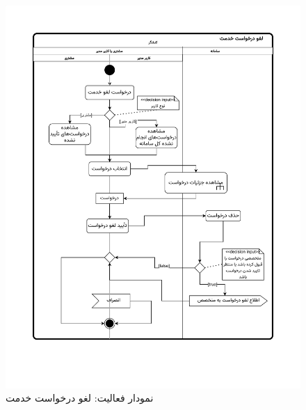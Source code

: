 \begin{figure}[ht!]
	\centering
	\includegraphics[scale=0.8, page=1]{figs/OOD-activity-cancelreq.pdf}
	\caption{نمودار فعالیت: لغو درخواست خدمت}
\end{figure}
\FloatBarrier
\newpage

